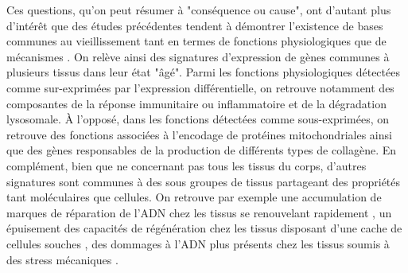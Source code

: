 Ces questions, qu'on peut résumer à "conséquence ou cause", ont d'autant plus d'intérêt que des études précédentes tendent à démontrer l'existence de bases communes au vieillissement tant en termes de fonctions physiologiques que de mécanismes . On relève ainsi des signatures d'expression de gènes communes à plusieurs tissus dans leur état "âgé". Parmi les fonctions physiologiques détectées comme sur-exprimées par l'expression différentielle, on retrouve notamment des composantes de la réponse immunitaire ou inflammatoire et de la dégradation lysosomale. À l'opposé, dans les fonctions détectées comme sous-exprimées, on retrouve des fonctions associées à l'encodage de protéines mitochondriales ainsi que des gènes responsables de la production de différents types de collagène. En complément, bien que ne concernant pas tous les tissus du corps, d'autres signatures sont communes à des sous groupes de tissus partageant des propriétés tant moléculaires que cellules. On retrouve par exemple une accumulation de marques de réparation de l'ADN chez les tissus se renouvelant rapidement , un épuisement des capacités de régénération chez les tissus disposant d'une cache de cellules souches , des dommages à l'ADN plus présents chez les tissus soumis à des stress mécaniques .


